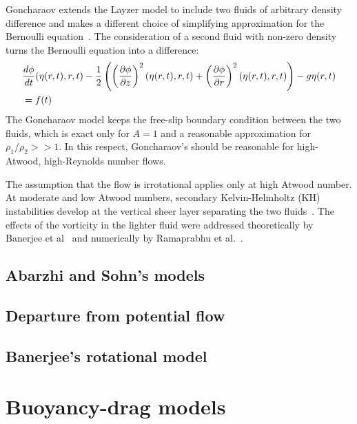 Goncharaov extends the Layzer model to include two fluids of arbitrary density difference and makes a different choice of simplifying approximation for the Bernoulli equation~\cite{Goncharaov2002}.
The consideration of a second fluid with non-zero density turns the Bernoulli equation  into a difference:
\begin{equation} \label{eqn:GonBernoulli}
\begin{aligned}
&\frac{d \phi}{d t}(\eta(r,t), r, t) - \frac{1}{2} \left(\left(\frac{\partial \phi}{\partial z}\right)^2(\eta(r,t), r, t) +\left(\frac{\partial \phi}{\partial r}\right)^2(\eta(r,t), r, t)\right) - g \eta(r,t) \\
&= f(t) \\
\end{aligned}
\end{equation}
The Goncharaov model keeps the free-slip boundary condition between the two fluids, which is exact only for $A = 1$ and a reasonable approximation for $\rho_1 / \rho_2 >> 1$.
In this respect, Goncharaov's should be reasonable for high-Atwood, high-Reynolds number flows.

The assumption that the flow is irrotational applies only at high Atwood number.
At moderate and low Atwood numbers, secondary Kelvin-Helmholtz (KH) instabilities develop at the vertical sheer layer separating the two fluids~\cite{Ramaprabhu2006,Wilkinson2007}.
The effects of the vorticity in the lighter fluid were addressed theoretically by Banerjee et al~\cite{Banerjee2011} and numerically by Ramaprabhu et al.~\cite{Ramaprabhu2012}.

\subsection{Abarzhi and Sohn's models}

\subsection{Departure from potential flow}

\subsection{Banerjee's rotational model}

\cite{Banerjee2011}

\section{Buoyancy-drag models}

